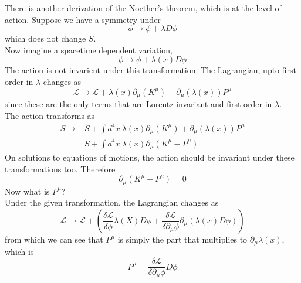 \documentclass[11pt, notitlepage]{report}
\newcommand{\del}{\partial}
\newcommand{\ld}{\mathcal{L}}
\numberwithin{equation}{section}
\begin{document}
    There is another derivation of the Noether's theorem, which is at the level of action. Suppose we have a symmetry under 
    \begin{equation*}
        \phi \to \phi + \lambda D\phi
    \end{equation*}
    which does not change \(S\).\\
    Now imagine a spacetime dependent variation, 
    \begin{equation*}
        \phi \to \phi + \lambda(x) D\phi
    \end{equation*}
    The action is not invarient under this transformation. The Lagrangian, upto first order in \(\lambda\) changes as 
    \begin{equation*}
        \ld \to \ld + \lambda(x) \del_\mu(K^\mu) + \del_\mu(\lambda(x)) P^\mu
    \end{equation*}
    since these are the only terms that are Lorentz invariant and first order in \(\lambda\).\\
    The action transforms as 
    \begin{align*}
        S \to &S + \int d^4x~ \lambda(x) \del_\mu(K^\mu) + \del_\mu(\lambda(x)) P^\mu\\
        = & S + \int d^4x ~ \lambda(x) \del_\mu (K^\mu - P^\mu)
    \end{align*}
    On solutions to equations of motions, the action should be invariant under these transformations too. Therefore 
    \begin{equation*}
        \del_\mu (K^\mu - P^\mu) = 0
    \end{equation*}
    Now what is \(P^\mu\)? \\
    Under the given transformation, the Lagrangian changes as 
    \begin{equation*}
        \ld \to \ld + \left( \frac{\delta \ld}{\delta \phi}\lambda(X) D\phi +  \frac{\delta \ld}{\delta \del_\mu \phi} \del_\mu(\lambda(x) D\phi) \right)
    \end{equation*}
    from which we can see that \(P^\mu\) is simply the part that multiplies to \(\del_\mu \lambda(x)\), which is 
    \begin{equation*}
        P^\mu = \frac{\delta \ld}{\delta \del_\mu \phi} D\phi
    \end{equation*}

\end{document}
